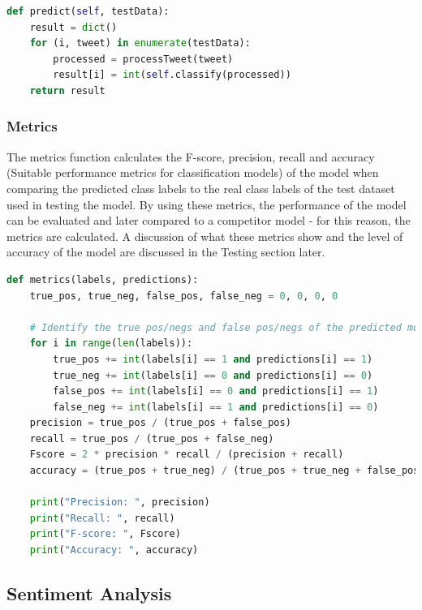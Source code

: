 \documentclass[oneside, 12pt]{article}
\begin{document}
		\begin{lstlisting}[language=python, caption=Predict function of parent classifier class of spam\_filter.py]
def predict(self, testData):
	result = dict()
	for (i, tweet) in enumerate(testData):
		processed = processTweet(tweet)
		result[i] = int(self.classify(processed))
	return result
		\end{lstlisting}
		
		\subsubsection{Metrics}
		
		The metrics function calculates the F-score, precision, recall and accuracy (Suitable performance metrics for classification models) of the model when comparing the predicted class labels to the real class labels of the test dataset used in testing the model. By using these metrics, the performance of the model can be evaluated and later compared to a competitor model - for this reason, the metrics are calculated. A discussion of what these metrics show and the level of accuracy of the model are  discussed in the Testing section later.
		
		\begin{lstlisting}[language=python, caption=Metrics function for calculating the performance and accuracy of the model]
def metrics(labels, predictions):
	true_pos, true_neg, false_pos, false_neg = 0, 0, 0, 0
	
	# Identify the true pos/negs and false pos/negs of the predicted model of predicted values compared to the actual true values of the test dataset class labels
	for i in range(len(labels)):
		true_pos += int(labels[i] == 1 and predictions[i] == 1)
		true_neg += int(labels[i] == 0 and predictions[i] == 0)
		false_pos += int(labels[i] == 0 and predictions[i] == 1)
		false_neg += int(labels[i] == 1 and predictions[i] == 0)
	precision = true_pos / (true_pos + false_pos)
	recall = true_pos / (true_pos + false_neg)
	Fscore = 2 * precision * recall / (precision + recall)
	accuracy = (true_pos + true_neg) / (true_pos + true_neg + false_pos + false_neg)

	print("Precision: ", precision)
	print("Recall: ", recall)
	print("F-score: ", Fscore)
	print("Accuracy: ", accuracy)
		\end{lstlisting}
		
		\subsection{Sentiment Analysis}
		
\end{document}
